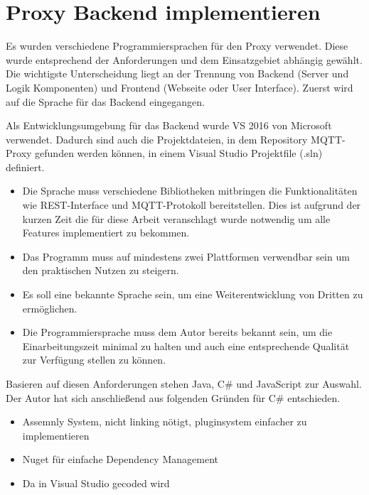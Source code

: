 \section{Proxy Backend implementieren}

    Es wurden verschiedene Programmiersprachen für den Proxy verwendet. Diese wurde entsprechend der Anforderungen und dem Einsatzgebiet abhängig gewählt.
    Die wichtigste Unterscheidung liegt an der Trennung von Backend (Server und Logik Komponenten) und Frontend (Webseite oder User Interface).
    Zuerst wird auf die Sprache für das Backend eingegangen.
    
    Als Entwicklungsumgebung für das Backend wurde \ac{VS} 2016 \cite{microsoft_2019} von Microsoft verwendet. Dadurch sind auch die Projektdateien, in dem Repository \glqq MQTT-Proxy\grqq{} \cite{eisenschmidt_2019} gefunden werden können, in einem Visual Studio Projektfile (.sln) definiert.
    
    \begin{itemize}
        \item Die Sprache muss verschiedene Bibliotheken mitbringen die Funktionalitäten wie REST-Interface und \ac{MQTT}-Protokoll bereitstellen. Dies ist aufgrund der kurzen Zeit die für diese Arbeit veranschlagt wurde notwendig um alle Features implementiert zu bekommen.
        \item Das Programm muss auf mindestens zwei Plattformen verwendbar sein um den praktischen Nutzen zu steigern.
        \item Es soll eine bekannte Sprache sein, um eine Weiterentwicklung von Dritten zu ermöglichen.
        \item Die Programmiersprache muss dem Autor bereits bekannt sein, um die Einarbeitungszeit minimal zu halten und auch eine entsprechende Qualität zur Verfügung stellen zu können.
    \end{itemize}
    Basieren auf diesen Anforderungen stehen Java, C\# und JavaScript zur Auswahl.
    Der Autor hat sich anschließend aus folgenden Gründen für C\# entschieden.
    \begin{itemize}
        \item Assemnly System, nicht linking nötigt, pluginsystem einfacher zu implementieren
        \item Nuget für einfache Dependency Management
        \item Da in Visual Studio gecoded wird
    \end{itemize}
    
